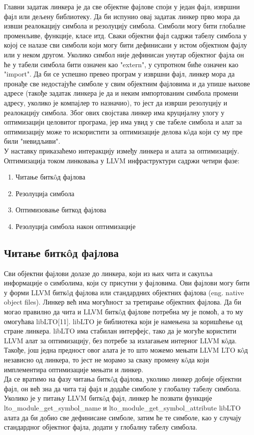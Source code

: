 \documentclass[12pt,oneside]{memoir}
\begin{document}
Главни задатак линкера је да све објектне фајлове споји у један фајл, извршни фајл
или дељену библиотеку. 
Да би испунио овај задатак линкер прво мора да извши реалокацију симбола и резолуцију
симбола.
Симболи могу бити глобалне променљиве, функције, класе итд. 
Сваки објектни фајл садржи табелу симбола у којој се налазе сви симболи који 
могу бити дефинисани у истом објектном фајлу или у неком другом.
Уколико симбол није дефинисан унутар објектног фајла он ће у табели симбола бити
означен као "extern", у супротном биће означен као "import".
Да би се успешно превео програм у извршни фајл, линкер мора да пронађе све 
недостајуће симболе у свим објектним фајловима и да упише њихове адресе (такође задатак
линкера је да и неким импортованим симбола промени адресу, уколико је компајлер то назначио),
то јест да изврши резолуцију и реалокацију симбола.
Због ових својстава линкер има круцијалну улогу у оптимизацији целовитог програма, јер
има увид у све табеле симбола и алат за оптимизацију може то искористити за оптимизације
делова к\^{o}да који су му пре били "невидљиви". 
\\
У наставку приказаћемо интеракцију између линкера и алата за оптимизацију.
Оптимизација током линковања у LLVM инфраструктури садржи четири фазе:
\begin{enumerate}
\item Читање битк\^{o}д фајлова
\item Резолуција симбола
\item Оптимизовање биткод фајлова
\item Резолуција симбола након оптимизације
\end{enumerate}

\subsection{Читање битк\^{o}д фајлова}
Сви објектни фајлови долазе до линкера, који из њих чита и сакупља информације
о симболима, који су присутни у фајловима.
Ови фајлови могу бити у форми LLVM битк\^{o}д фајлова или стандардних објектних
фајлова (eng. native object files).
Линкер већ има могућност за третирање објектних фајлова.
Да би могао
правилно да чита и LLVM битк\^{o}д фајлове потребна му је помоћ, а то му омогућава
 libLTO[11].
libLTO је библиотека који је намењена за коришћење од стране линкера.
libLTO има стабилан интерфејс, тако да је могуће користити
LLVM алат за оптимизацију, без потребе за излагањем интерног LLVM к\^{o}да.
Такође, још једна предност овог алата је то што можемо мењати LLVM LTO к\^{o}д независно
од линкера, то јест не морамо за сваку промену к\^{o}да који имплементира
оптимизације мењати и линкер.
\\
Да се вратимо на фазу читања битк\^{o}д фајлова, уколико линкер добије
објектни фајл, он већ зна да чита тај фајл и додаће симболе у глобалну табелу симбола.
Уколико је у питању LLVM битк\^{o}д фајл, линкер ће позвати функције \\
lto{\_}module{\_}get{\_}symbol{\_}name и 
lto{\_}module{\_}get{\_}symbol{\_}attribute 
libLTO алата да би добио све дефинисане  симболе, затим ће те симболе, 
као у случају стандардног објектног фајла, додати у глобалну табелу симбола.
\end{document}
